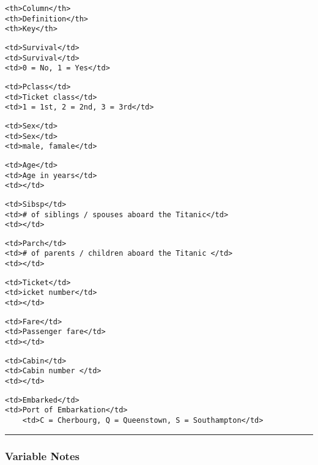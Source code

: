 \documentclass[11pt]{article}
\begin{document}
\begin{verbatim}
<th>Column</th>
<th>Definition</th>
<th>Key</th>
\end{verbatim}

\begin{verbatim}
<td>Survival</td>
<td>Survival</td>
<td>0 = No, 1 = Yes</td>
\end{verbatim}

\begin{verbatim}
<td>Pclass</td>
<td>Ticket class</td>
<td>1 = 1st, 2 = 2nd, 3 = 3rd</td>
\end{verbatim}

\begin{verbatim}
<td>Sex</td>
<td>Sex</td>
<td>male, famale</td>
\end{verbatim}

\begin{verbatim}
<td>Age</td>
<td>Age in years</td>
<td></td>
\end{verbatim}

\begin{verbatim}
<td>Sibsp</td>
<td># of siblings / spouses aboard the Titanic</td>
<td></td>
\end{verbatim}

\begin{verbatim}
<td>Parch</td>
<td># of parents / children aboard the Titanic </td>
<td></td>
\end{verbatim}

\begin{verbatim}
<td>Ticket</td>
<td>icket number</td>
<td></td>
\end{verbatim}

\begin{verbatim}
<td>Fare</td>
<td>Passenger fare</td>
<td></td>
\end{verbatim}

\begin{verbatim}
<td>Cabin</td>
<td>Cabin number </td>
<td></td>
\end{verbatim}

\begin{verbatim}
<td>Embarked</td>
<td>Port of Embarkation</td>
    <td>C = Cherbourg, Q = Queenstown, S = Southampton</td>
\end{verbatim}

    \begin{center}\rule{0.5\linewidth}{\linethickness}\end{center}

\subsubsection{Variable Notes}\label{variable-notes}
\end{document}
